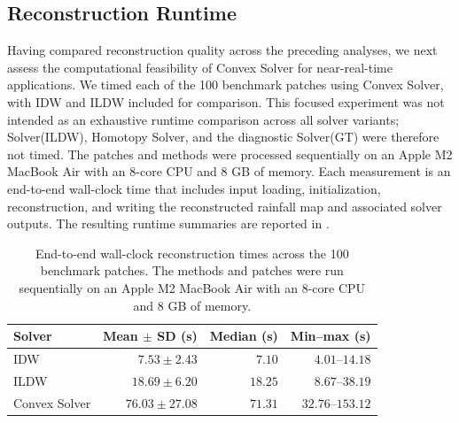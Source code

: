 \documentclass[11pt]{article}
\begin{document}
\FloatBarrier
\subsection{Reconstruction Runtime}
{\color{black}Having compared reconstruction quality across the preceding analyses, we next assess the computational feasibility of Convex Solver for near-real-time applications. We timed each of the 100 benchmark patches using Convex Solver, with IDW and ILDW included for comparison. This focused experiment was not intended as an exhaustive runtime comparison across all solver variants; Solver(ILDW), Homotopy Solver, and the diagnostic Solver(GT) were therefore not timed.} The patches and methods were processed sequentially on an Apple M2 MacBook Air with an 8-core CPU and 8 GB of memory. Each measurement is an end-to-end wall-clock time that includes input loading, initialization, reconstruction, and writing the reconstructed rainfall map and associated solver outputs. The resulting runtime summaries are reported in .

\begin{table}[H]
  \centering
  \begin{tabular}{lrrr}
    \toprule
    Solver & Mean $\pm$ SD (s) & Median (s) & Min--max (s) \\
    \midrule
    IDW & $7.53 \pm 2.43$ & $7.10$ & $4.01$--$14.18$ \\
    ILDW & $18.69 \pm 6.20$ & $18.25$ & $8.67$--$38.19$ \\
    Convex Solver & $76.03 \pm 27.08$ & $71.31$ & $32.76$--$153.12$ \\
    \bottomrule
  \end{tabular}
  \caption{End-to-end wall-clock reconstruction times across the 100 benchmark patches. The methods and patches were run sequentially on an Apple M2 MacBook Air with an 8-core CPU and 8 GB of memory.}
  \label{tab:runtime_summary}
\end{table}
\end{document}
